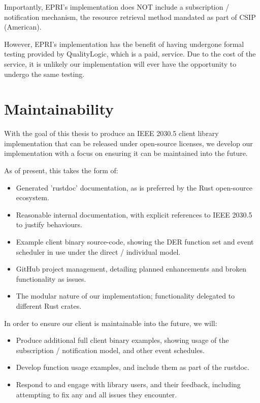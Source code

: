 Importantly, EPRI's implementation does NOT include a subscription / notification mechanism, the resource retrieval method mandated as part of CSIP (American). \cite{20305workshop}

However, EPRI's implementation has the benefit of having undergone formal testing provided by QualityLogic, which is a paid, service. Due to the cost of the service, it is unlikely our implementation will ever have the opportunity to undergo the same testing.

\section{Maintainability}
With the goal of this thesis to produce an IEEE 2030.5 client library implementation that can be released under open-source licenses, we develop our implementation with a focus on ensuring it can be maintained into the future. 

As of present, this takes the form of:

\begin{itemize}
    \item Generated 'rustdoc' documentation, as is preferred by the Rust open-source ecosystem.
    \item Reasonable internal documentation, with explicit references to IEEE 2030.5 to justify behaviours.
    \item Example client binary source-code, showing the DER function set and event scheduler in use under the direct / individual model.
    \item GitHub project management, detailing planned enhancements and broken functionality as issues.
    \item The modular nature of our implementation; functionality delegated to different Rust crates.
\end{itemize}

In order to ensure our client is maintainable into the future, we will:

\begin{itemize}
    \item Produce additional full client binary examples, showing usage of the subscription / notification model, and other event schedules.
    \item Develop function usage examples, and include them as part of the rustdoc.
    \item Respond to and engage with library users, and their feedback, including attempting to fix any and all issues they encounter.
\end{itemize}

